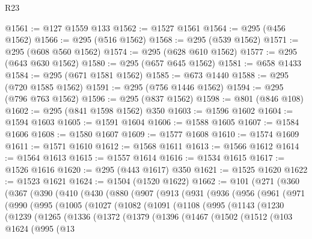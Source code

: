 \begin{lexlean}{R23}
\begin{coremodule}
@1561 := @127 @1559 @133
@1562 := @1527 @1561
@1564 := @295 (@456 @1562)
@1566 := @295 (@516 @1562)
@1568 := @295 (@539 @1562)
@1571 := @295 (@608 @560 @1562)
@1574 := @295 (@628 @610 @1562)
@1577 := @295 (@643 @630 @1562)
@1580 := @295 (@657 @645 @1562)
@1581 := @658 @1433
@1584 := @295 (@671 @1581 @1562)
@1585 := @673 @1440
@1588 := @295 (@720 @1585 @1562)
@1591 := @295 (@756 @1446 @1562)
@1594 := @295 (@796 @763 @1562)
@1596 := @295 (@837 @1562)
@1598 := @801 (@846 @108)
@1602 := @295 (@841 @1598 @1562) @350
@1603 := @1596 @1602
@1604 := @1594 @1603
@1605 := @1591 @1604
@1606 := @1588 @1605
@1607 := @1584 @1606
@1608 := @1580 @1607
@1609 := @1577 @1608
@1610 := @1574 @1609
@1611 := @1571 @1610
@1612 := @1568 @1611
@1613 := @1566 @1612
@1614 := @1564 @1613
@1615 := @1557 @1614
@1616 := @1534 @1615
@1617 := @1526 @1616
@1620 := @295 (@443 @1617) @350
@1621 := @1525 @1620
@1622 := @1523 @1621
@1624 := @1504 (@1520 @1622)
@1662 := @101
    (@271
      (@360
        (@367
          (@390
            (@410
              (@430
                (@880
                  (@907
                    (@913
                      (@931
                        (@936
                          (@956
                            (@961
                              (@971
                                (@990
                                  (@995
                                    (@1005
                                      (@1027
                                        (@1082
                                          (@1091
                                            (@1108
                                              (@995
                                                (@1143
                                                  (@1230
                                                    (@1239
                                                      (@1265
                                                        (@1336
                                                          (@1372
                                                            (@1379
                                                              (@1396
                                                                (@1467
                                                                  (@1502
                                                                    (@1512
                                                                      (@103
                                                                        @1624
                                                                        (@995
                                                                          (@13

\end{coremodule}
\end{lexlean}
